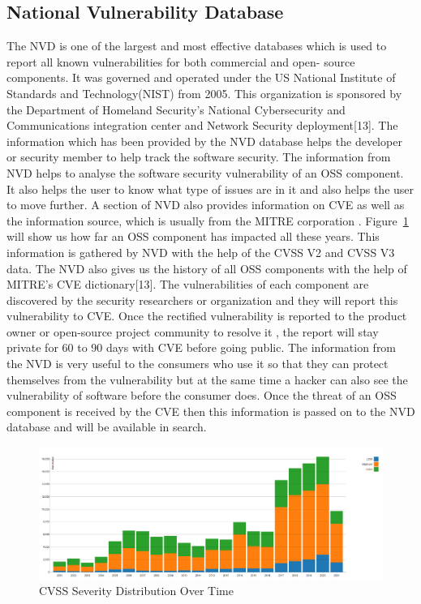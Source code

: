 \subsection{National Vulnerability Database}
The \acs{NVD} is one of the largest and most effective databases which is used to report all known vulnerabilities for both commercial and open- source components. It was governed and operated under the US National Institute of Standards and Technology(NIST) from 2005. This organization is sponsored by the Department of Homeland Security's National Cybersecurity and Communications integration center and Network Security deployment[13]. The information which has been provided by the \acs{NVD} database helps the developer or security member to help track the software security. The information from \acs{NVD} helps to analyse the software security vulnerability of an \acs{OSS} component. It also helps the user to know what type of issues are in it and also helps the user to move further. A section of \acs{NVD} also provides information on \acs{CVE} as well as the information source, which is usually from the MITRE corporation \cite{TheNVD}. Figure~\ref{fig:vulgraph} will show us how far an \acs{OSS} component has impacted all these years. This information is gathered by \acs{NVD} with the help of the CVSS V2 and CVSS V3 data. The \acs{NVD} also gives us the history of all \acs{OSS} components with the help of MITRE’s \acs{CVE} dictionary[13]. The vulnerabilities of each component are discovered by the security researchers or organization and they will report this vulnerability to CVE. Once the rectified vulnerability is reported to the product owner or open-source project community to resolve it , the report will stay private for 60 to 90 days with \acs{CVE} before going public. The information from the \acs{NVD} is very useful to the consumers who use it so that they can protect themselves from the vulnerability but at the same time a hacker can also see the vulnerability of software before the consumer does. Once the threat of an \acs{OSS} component is received by the \acs{CVE} then this information is passed on to the \acs{NVD} database and will be available in search.

\begin{figure}[h!]
	\includegraphics[width=15cm]{includes/vulgraph.PNG}
	\centering
	\caption{\acs{CVSS} Severity Distribution Over Time \cite{NVDgraph}}
	\label{fig:vulgraph}
\end{figure}
%
